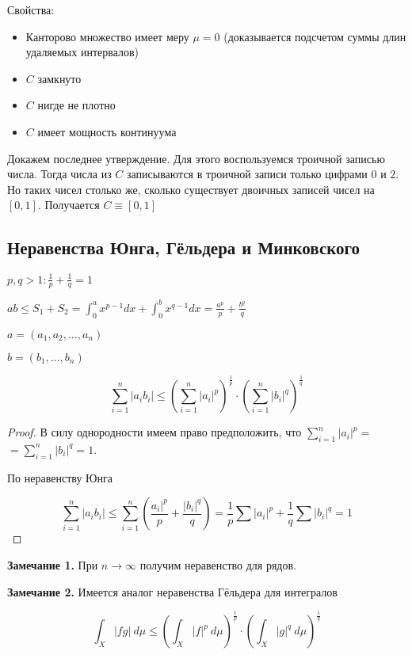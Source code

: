 Свойства:
\begin{itemize}
  \item Канторово множество имеет меру $\mu = 0$ (доказывается подсчетом суммы длин удаляемых интервалов)
  \item $C$ замкнуто
  \item $C$ нигде не плотно
  \item $C$ имеет мощность континуума
\end{itemize}

Докажем последнее утверждение. Для этого воспользуемся троичной записью числа.
Тогда числа из $C$ записываются в троичной записи только цифрами $0$ и $2$. Но таких чисел столько же, сколько существует двоичных записей
чисел на $[0, 1]$. Получается $C \equiv [0, 1]$



\subsection{Неравенства Юнга, Гёльдера и Минковского}

$p, q > 1 : \frac{1}{p} + \frac{1}{q} = 1$

\begin{theorem}[Юнг]
  $ab \leq S_1 + S_2 = \int_{0}^{a} x^{p-1} dx + \int_0^b x^{q-1} dx = \frac{a^p}{p} + \frac{b^q}{q}$
\end{theorem}

\begin{theorem}[Гёльдер]
  $a = (a_1, a_2, \dots, a_n)$

  $b = (b_1, \dots, b_n)$

  $$\sum_{i = 1}^{n} |a_ib_i| \leq \left(\sum_{i=1}^n |a_i|^p \right)^{\frac{1}{p}} \cdot \left(\sum_{i=1}^n |b_i|^q \right)^{\frac{1}{q}}$$
\end{theorem}

\begin{proof}
  В силу однородности имеем право предположить, что $\sum_{i=1}^n |a_i|^p =$\\$= \sum_{i=1}^n |b_i|^q = 1$.

  По неравенству Юнга
  
  $$\sum_{i = 1}^{n} |a_ib_i| \leq \sum_{i = 1}^n \left( \frac{a_i|^p}{p} + \frac{|b_i|^q}{q}\right) =
  \frac{1}{p}\sum |a_i|^p + \frac{1}{q} \sum |b_i|^q = 1$$
\end{proof}

\textbf{Замечание 1.} При $n \to \infty$ получим неравенство для рядов.

\textbf{Замечание 2.} Имеется аналог неравенства Гёльдера для интегралов

\begin{theorem}
  $$\int_X |fg|\ d\mu \leq \left(\int_X |f|^p\ d\mu \right)^\frac{1}{p} \cdot \left(\int_X |g|^q\ d\mu \right)^\frac{1}{q}$$
\end{theorem}